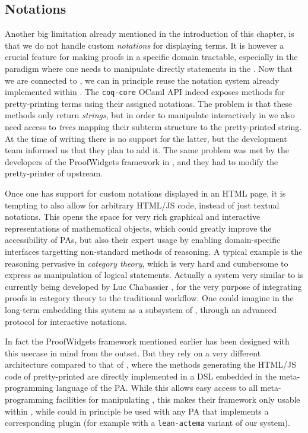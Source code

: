 \subsection{Notations}

Another big limitation already mentioned in the introduction of this chapter, is
that we do not handle custom \emph{notations} for displaying
terms. It is however a crucial feature for making proofs in a specific
domain tractable, especially in the  paradigm where one needs to
manipulate directly statements in the . Now that we are connected to , we
can in principle reuse the notation system already implemented within . The
\texttt{coq-core} OCaml API indeed exposes methods for pretty-printing  terms
using their assigned notations. The problem is that these methods only return
\emph{strings}, but in order to manipulate  interactively in  we also
need access to \emph{trees} mapping their subterm structure to the
pretty-printed string. At the time of writing there is no support for the
latter, but the  development team informed us that they plan to add it. The
same problem was met by the developers of the ProofWidgets framework in ,
and they had to modify the pretty-printer of  upstream.

Once one has support for custom notations displayed in an HTML page, it is
tempting to also allow for arbitrary HTML/JS code, instead of just textual
notations. This opens the space for very rich graphical and interactive
representations of mathematical objects, which could greatly improve the
accessibility of PAs, but also their expert usage by enabling domain-specific
interfaces targetting non-standard methods of reasoning. A typical example is
the \emph{} reasoning pervasive in \emph{category theory}, which is
very hard and cumbersome to express as manipulation of logical statements.
Actually a system very similar to  is currently being
developed by Luc Chabassier \cite{LucTalk}, for the very purpose of integrating
 proofs in category theory to the traditional  workflow.
One could imagine in the long-term embedding this system as a subsystem of
, through an advanced protocol for interactive notations.

In fact the ProofWidgets framework mentioned earlier has been designed with this
usecase in mind from the outset. But they rely on a very different architecture
compared to that of , where the methods generating the
HTML/JS code of pretty-printed  are directly implemented in a DSL embedded
in the meta-programming language of the PA. While this allows easy access to all
meta-programming facilities for manipulating , this makes their framework
only usable within , while  could in principle be used with any PA
that implements a corresponding plugin (for example with a \texttt{lean-actema}
variant of our system).


